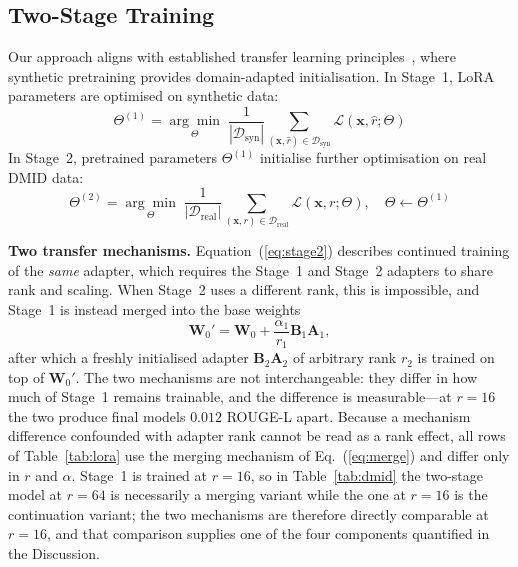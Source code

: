 \documentclass{wlscirep}
\begin{document}
\subsection*{Two-Stage Training}

Our approach aligns with established transfer learning principles~\cite{pan2010transfer, zhuang2021survey}, where synthetic pretraining provides domain-adapted initialisation. In Stage~1, LoRA parameters are optimised on synthetic data:
\begin{equation}
\Theta^{(1)} = \underset{\Theta}{\arg\min} \; \frac{1}{|\mathcal{D}_{\text{syn}}|} \sum_{(\mathbf{x}, \hat{r}) \in \mathcal{D}_{\text{syn}}} \mathcal{L}(\mathbf{x}, \hat{r}; \Theta)
\end{equation}
In Stage~2, pretrained parameters $\Theta^{(1)}$ initialise further optimisation on real DMID data:
\begin{equation}
\Theta^{(2)} = \underset{\Theta}{\arg\min} \; \frac{1}{|\mathcal{D}_{\text{real}}|} \sum_{(\mathbf{x}, r) \in \mathcal{D}_{\text{real}}} \mathcal{L}(\mathbf{x}, r; \Theta), \quad \Theta \leftarrow \Theta^{(1)}
\label{eq:stage2}
\end{equation}

\textbf{Two transfer mechanisms.} Equation~(\ref{eq:stage2}) describes continued training of the \emph{same} adapter, which requires the Stage~1 and Stage~2 adapters to share rank and scaling. When Stage~2 uses a different rank, this is impossible, and Stage~1 is instead merged into the base weights
\begin{equation}
\mathbf{W}_0' = \mathbf{W}_0 + \frac{\alpha_1}{r_1}\mathbf{B}_1\mathbf{A}_1 ,
\label{eq:merge}
\end{equation}
after which a freshly initialised adapter $\mathbf{B}_2\mathbf{A}_2$ of arbitrary rank $r_2$ is trained on top of $\mathbf{W}_0'$. The two mechanisms are not interchangeable: they differ in how much of Stage~1 remains trainable, and the difference is measurable---at $r=16$ the two produce final models $0.012$ ROUGE-L apart. Because a mechanism difference confounded with adapter rank cannot be read as a rank effect, all rows of Table~\ref{tab:lora} use the merging mechanism of Eq.~(\ref{eq:merge}) and differ only in $r$ and $\alpha$. Stage~1 is trained at $r=16$, so in Table~\ref{tab:dmid} the two-stage model at $r=64$ is necessarily a merging variant while the one at $r=16$ is the continuation variant; the two mechanisms are therefore directly comparable at $r=16$, and that comparison supplies one of the four components quantified in the Discussion.
\end{document}
